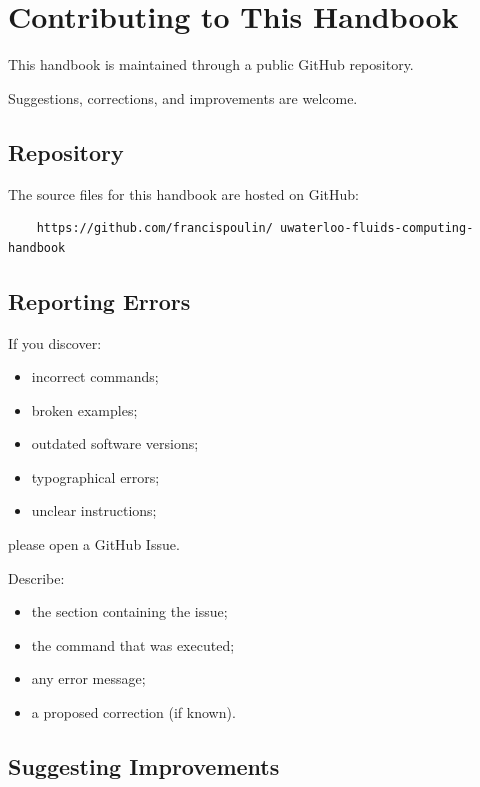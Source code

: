 \section{Contributing to This Handbook} 

This handbook is maintained through a public GitHub repository. 

Suggestions, corrections, and improvements are welcome. 

\subsection{Repository} 

The source files for this handbook are hosted on GitHub: 

\begin{lstlisting} 
    https://github.com/francispoulin/ uwaterloo-fluids-computing-handbook 
\end{lstlisting} 

\subsection{Reporting Errors} 

If you discover: 

\begin{itemize} 
    \item incorrect commands; 
    \item broken examples; 
    \item outdated software versions; 
    \item typographical errors; 
    \item unclear instructions; 
\end{itemize} 

please open a GitHub Issue. 

Describe: 

\begin{itemize} 
    \item the section containing the issue; 
    \item the command that was executed; 
    \item any error message; 
    \item a proposed correction (if known). 
\end{itemize} 

\subsection{Suggesting Improvements} 


